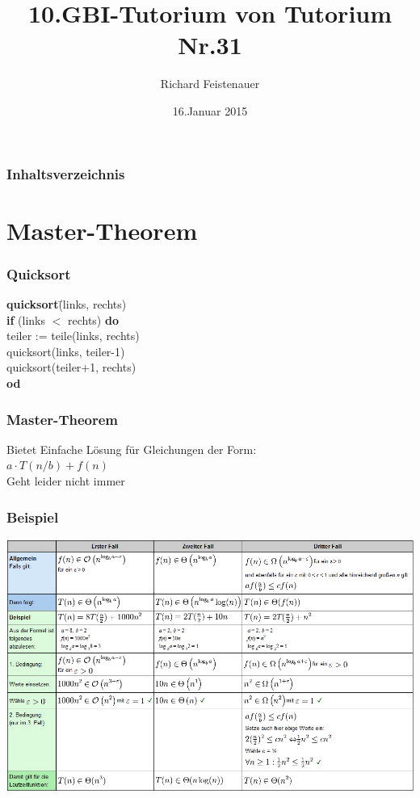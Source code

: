 \documentclass{beamer}
\author{Richard Feistenauer}
\title{10.GBI-Tutorium von Tutorium Nr.31}
\date{16.Januar 2015}
\begin{document}
\begin {frame}
	\titlepage
\end {frame}

\begin{frame}
\frametitle {Inhaltsverzeichnis}
	\tableofcontents
\end{frame}

\section{Master-Theorem}
\begin{frame}
	\frametitle{Quicksort}
	\begin{tabbing}
		\textbf{quick}\=\textbf{sort}\=(links, rechts)\\
		\>\textbf{if} (links $<$ rechts) \textbf{do}\\
		\> \>teiler := teile(links, rechts)\\
		\> \>quicksort(links, teiler-1)\\
		\> \>quicksort(teiler+1, rechts)\\
		\>\textbf{od}
	\end{tabbing}
\end{frame}

\begin{frame}
	\frametitle{Master-Theorem}
	\begin{block}{Bietet}
		Einfache Lösung für Gleichungen der Form:\\
		$a\cdot T(n/b) +f(n)$\\
		\pause \bigskip
		Geht leider nicht immer
	\end{block}
\end{frame}

\begin{frame}
	\frametitle{Beispiel}
	\includegraphics[scale=0.45]{masterTheorem.jpg}
\end{frame}
\end{document}
